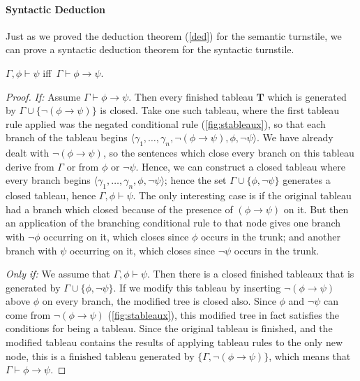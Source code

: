 \paragraph{Syntactic Deduction} Just as we proved the deduction theorem (\autoref{ded}) for the semantic turnstile, we can prove a syntactic deduction theorem for the syntactic turnstile.
\begin{theorem}\label{thm:sdt} $\Gamma, \phi\vdash \psi$ iff\, $\Gamma \vdash \phi \to \psi$. \begin{proof} {\em If:} Assume $\Gamma \vdash \phi \to \psi$. Then every finished tableau $\mathbf{T}$ which is generated by $\Gamma \cup\{\neg(\phi \to \psi)\}$ is closed. Take one such tableau, where the first tableau rule applied was the negated conditional rule (\autoref{fig:stableaux}), so that each branch of the tableau begins $\langle \gamma_{1},\ldots,\gamma_{n}, \neg (\phi \to \psi), \phi, \neg \psi\rangle$. We have already dealt with $\neg (\phi \to \psi)$, so the sentences which close every branch on this tableau derive from $\Gamma$ or from $\phi$ or $\neg \psi$. Hence, we can construct a closed tableau where every branch begins $\langle \gamma_{1},\ldots,\gamma_{n}, \phi, \neg \psi\rangle$; hence the set $\Gamma\cup \{\phi, \neg \psi\}$ generates a closed tableau, hence $\Gamma, \phi \vdash \psi$. The only interesting case is if the original tableau had a branch which closed because of the presence of $(\phi \to \psi)$ on it. But then an application of the branching conditional rule to that node gives one branch with $\neg\phi$ occurring on it, which closes since $\phi$ occurs in the trunk;  and another branch with $\psi$ occurring on it, which closes since $\neg \psi$ occurs in the trunk. 

{\em Only if:} We assume that $\Gamma, \phi \vdash \psi$. Then there is a closed finished tableaux that is generated by $\Gamma\cup \{\phi, \neg \psi\}$. If we modify this tableau by inserting $\neg(\phi \to \psi)$ above $\phi$ on every branch, the modified tree is closed also. Since $\phi$ and $\neg \psi$ can come from $\neg (\phi \to \psi)$ (\autoref{fig:stableaux}), this modified tree in fact satisfies the conditions for being a tableau. Since the original tableau is finished, and the modified tableau contains the results of applying tableau rules to the only new node, this is a finished tableau generated by $\{\Gamma, \neg(\phi \to \psi)\}$, which means that $\Gamma \vdash \phi \to \psi$.
\end{proof}\end{theorem}


